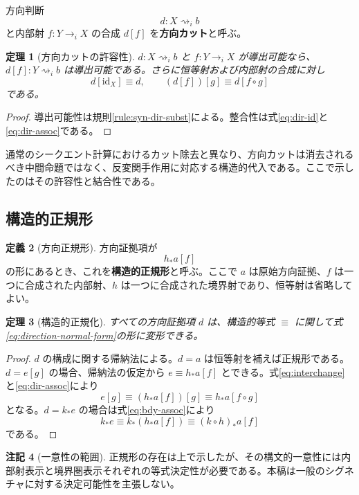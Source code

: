 \documentclass[a4paper,11pt]{ltjsarticle}
\theoremstyle{definition}
\newtheorem{definition}{定義}[section]
\newtheorem{remark}[definition]{注記}
\theoremstyle{plain}
\newtheorem{theorem}[definition]{定理}
\newcommand{\DEq}{\equiv}
\begin{document}
方向判断
\[
 d:X\rightsquigarrow_i b
\]
と内部射 $f:Y\to_iX$ の合成 $d[f]$ を\textbf{方向カット}と呼ぶ。

\begin{theorem}[方向カットの許容性]
$d:X\rightsquigarrow_i b$ と $f:Y\to_iX$ が導出可能なら、$d[f]:Y\rightsquigarrow_i b$ は導出可能である。さらに恒等射および内部射の合成に対し
\[
 d[\mathrm{id}_X]\DEq d,
 \qquad
 (d[f])[g]\DEq d[f\circ g]
\]
である。
\end{theorem}

\begin{proof}
導出可能性は規則\textup{\eqref{rule:syn-dir-subst}}による。整合性は式\eqref{eq:dir-id}と\eqref{eq:dir-assoc}である。
\end{proof}

通常のシークエント計算におけるカット除去と異なり、方向カットは消去されるべき中間命題ではなく、反変関手作用に対応する構造的代入である。ここで示したのはその許容性と結合性である。

\subsection{構造的正規形}

\begin{definition}[方向正規形]
方向証拠項が
\begin{equation}
 h_*a[f]
 \label{eq:direction-normal-form}
\end{equation}
の形にあるとき、これを\textbf{構造的正規形}と呼ぶ。ここで $a$ は原始方向証拠、$f$ は一つに合成された内部射、$h$ は一つに合成された境界射であり、恒等射は省略してよい。
\end{definition}

\begin{theorem}[構造的正規化]
すべての方向証拠項 $d$ は、構造的等式 $\DEq$ に関して式\eqref{eq:direction-normal-form}の形に変形できる。
\end{theorem}

\begin{proof}
$d$ の構成に関する帰納法による。$d=a$ は恒等射を補えば正規形である。$d=e[g]$ の場合、帰納法の仮定から $e\DEq h_*a[f]$ とできる。式\eqref{eq:interchange}と\eqref{eq:dir-assoc}により
\[
 e[g]\DEq(h_*a[f])[g]
 \DEq h_*a[f\circ g]
\]
となる。$d=k_*e$ の場合は式\eqref{eq:bdy-assoc}により
\[
 k_*e\DEq k_*(h_*a[f])
 \DEq(k\circ h)_*a[f]
\]
である。
\end{proof}

\begin{remark}[一意性の範囲]
正規形の存在は上で示したが、その構文的一意性には内部射表示と境界圏表示それぞれの等式決定性が必要である。本稿は一般のシグネチャに対する決定可能性を主張しない。
\end{remark}
\end{document}
